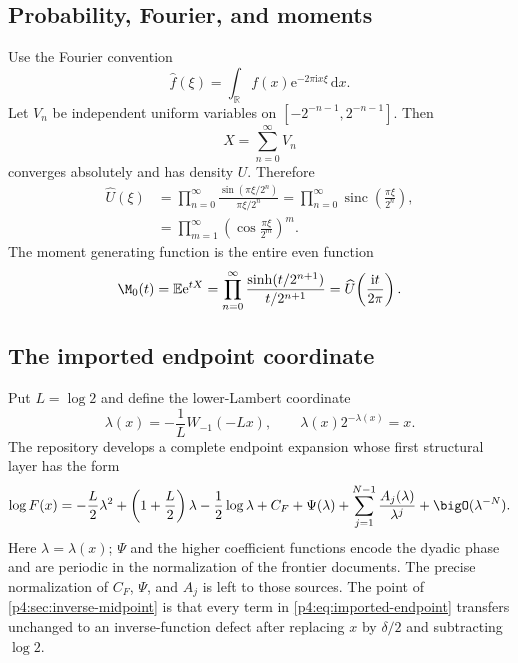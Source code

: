 \documentclass[11pt]{article}
\numberwithin{equation}{section}
\theoremstyle{definition}
\theoremstyle{remark}
\newcommand{\R}{\mathbb R}
\newcommand{\E}{\mathbb E}
\newcommand{\sinc}{\operatorname{sinc}}
\newcommand{\dd}{\,\mathrm d}
\newcommand{\e}{\mathrm e}
\newcommand{\ii}{\mathrm i}
\begin{document}
\subsection{Probability, Fourier, and moments}
Use the Fourier convention
\begin{equation}
 \widehat f(\xi)=\int_{\R}f(x)\e^{-2\pi\ii x\xi}\dd x.
 \label{p4:eq:fourier-convention}
\end{equation}
Let $V_n$ be independent uniform variables on
$[-2^{-n-1},2^{-n-1}]$.  Then
\begin{equation}
 X=\sum_{n=0}^{\infty}V_n
 \label{p4:eq:random-series}
\end{equation}
converges absolutely and has density $U$.  Therefore
\begin{align}
 \widehat U(\xi)
 &=\prod_{n=0}^{\infty}
   \frac{\sin(\pi\xi/2^n)}{\pi\xi/2^n}
  =\prod_{n=0}^{\infty}\sinc\!\left(\frac{\pi\xi}{2^n}\right),
 \label{p4:eq:sinc-product}\\
 &=\prod_{m=1}^{\infty}
   \left(\cos\frac{\pi\xi}{2^m}\right)^m.
 \label{p4:eq:cos-product}
\end{align}
The moment generating function is the entire even function
\begin{equation}
 \M_0(t)=\E\e^{tX}
 =\prod_{n=0}^{\infty}
   \frac{\sinh(t/2^{n+1})}{t/2^{n+1}}
 =\widehat U\!\left(\frac{\ii t}{2\pi}\right).
 \label{p4:eq:mgf}
\end{equation}

\subsection{The imported endpoint coordinate}
Put $L=\log2$ and define the lower-Lambert coordinate~\cite{p4:corless,p4:frontier}
\begin{equation}
 \lambda(x)=-\frac1L W_{-1}(-Lx),
 \qquad \lambda(x)2^{-\lambda(x)}=x.
 \label{p4:eq:lambda}
\end{equation}
The repository develops a complete endpoint expansion whose first structural layer has the form
\begin{equation}
 \log F(x)
 =-\frac L2\lambda^2
  +\left(1+\frac L2\right)\lambda
  -\frac12\log\lambda
  +C_F+\Psi(\lambda)
  +\sum_{j=1}^{N-1}\frac{A_j(\lambda)}{\lambda^j}
  +\bigO(\lambda^{-N}).
 \label{p4:eq:imported-endpoint}
\end{equation}
Here $\lambda=\lambda(x)$; $\Psi$ and the higher coefficient functions encode the dyadic phase and are periodic in the normalization of the frontier documents.  The precise normalization of $C_F$, $\Psi$, and $A_j$ is left to those sources.  The point of \cref{p4:sec:inverse-midpoint} is that every term in \eqref{p4:eq:imported-endpoint} transfers unchanged to an inverse-function defect after replacing $x$ by $\delta/2$ and subtracting $\log2$.
\end{document}
